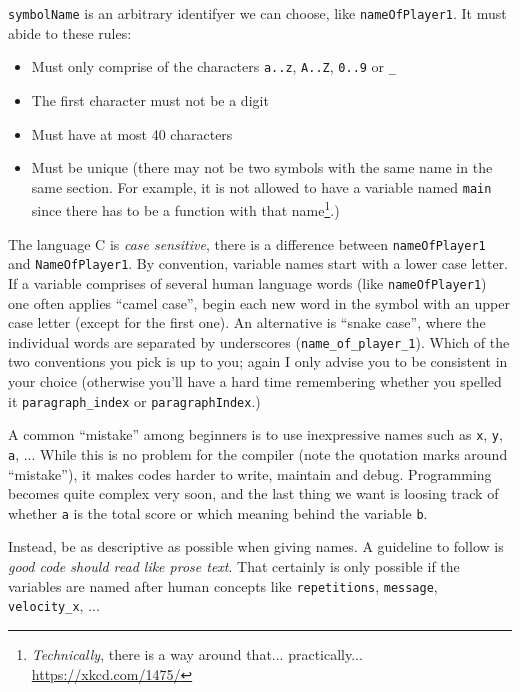 \texttt{symbolName} is an arbitrary identifyer we can choose, like \texttt{nameOfPlayer1}. It must abide to these rules:
\begin{itemize}
\item Must only comprise of the characters \texttt{a..z}, \texttt{A..Z}, \texttt{0..9} or \texttt{\_}
\item The first character must not be a digit
\item Must have at most 40 characters
\item Must be unique (there may not be two symbols with the same name in the same section. For example, it is not allowed to have a variable named \texttt{main} 
	since there has to be a function with that name\footnote{\emph{Technically}, there is a way around that... practically... \url{https://xkcd.com/1475/}}.)
\end{itemize}
The language C is \emph{case sensitive}, \ie there is a difference between \texttt{nameOfPlayer1} and \texttt{NameOfPlayer1}. By convention, variable names start with a lower case letter. If a variable comprises of several human language words (like \texttt{nameOfPlayer1}) one often applies \enquote{camel case}, \ie begin each new word in the symbol with an upper case letter (except for the first one). An alternative is \enquote{snake case}, where the individual words are separated by underscores (\texttt{name\_of\_player\_1}). Which of the two conventions you pick is up to you; again I only advise you to be consistent in your choice (otherwise you'll have a hard time remembering whether you spelled it \texttt{paragraph\_index} or \texttt{paragraphIndex}.)

\begin{hintbox}
A common \enquote{mistake} among beginners is to use inexpressive names such as \texttt{x}, \texttt{y}, \texttt{a}, ... While this is no problem for the compiler (note the quotation marks around \enquote{mistake}), it makes codes harder to write, maintain and debug. Programming becomes quite complex very soon, and the last thing we want is loosing track of whether \texttt{a} is the total score or which meaning behind the variable \texttt{b}.

Instead, be as descriptive as possible when giving names. A guideline to follow is \emph{good code should read like prose text}. That certainly is only possible if the variables are named after human concepts like \texttt{repetitions}, \texttt{message}, \texttt{velocity\_x}, ...
\end{hintbox}

